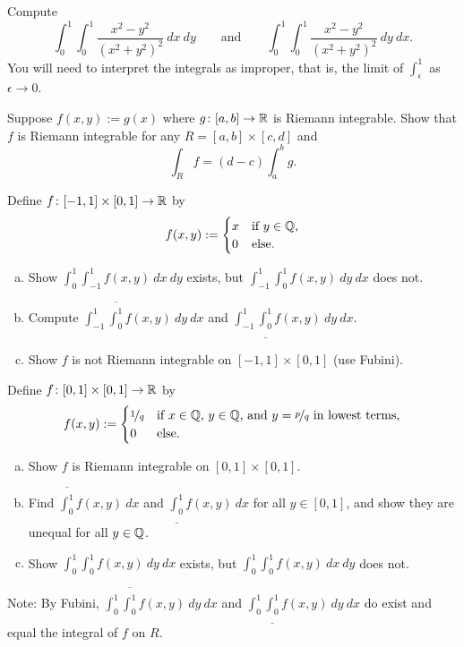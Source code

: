 \begin{exercise}
Compute
\begin{equation*}
\int_0^1 \int_0^1 \frac{x^2-y^2}{{(x^2+y^2)}^2} ~ dx ~ dy
\qquad \text{and} \qquad
\int_0^1 \int_0^1 \frac{x^2-y^2}{{(x^2+y^2)}^2} ~ dy ~ dx .
\end{equation*}
You will need to interpret the integrals as improper, that
is, the limit of $\int_\epsilon^1$ as $\epsilon \to 0$.
\end{exercise}

\begin{exercise}
Suppose $f(x,y) := g(x)$ where $g \colon [a,b] \to {\mathbb{R}}$ is Riemann integrable.
Show that $f$ is Riemann integrable for any $R = [a,b] \times [c,d]$ and 
\begin{equation*}
\int_R f = (d-c) \int_a^b g .
\end{equation*}
\end{exercise}

\begin{exercise}
Define $f \colon [-1,1] \times [0,1] \to {\mathbb{R}}$ by
\begin{equation*}
f(x,y) :=
\begin{cases}
x & \text{if $y \in {\mathbb{Q}}$,} \\
0 & \text{else.} 
\end{cases}
\end{equation*}
\begin{enumerate}[a)]
\item
Show
$\int_0^1 \int_{-1}^1 f(x,y) ~ dx ~ dy$ exists, but
$\int_{-1}^1 \int_0^1 f(x,y) ~ dy ~ dx$ does not.
\item
Compute
$\int_{-1}^1 \overline{\int_0^1} f(x,y) ~ dy ~ dx$ and
$\int_{-1}^1 \underline{\int_0^1} f(x,y) ~ dy ~ dx$.
\item
Show $f$ is not Riemann integrable on $[-1,1] \times [0,1]$ (use
Fubini).
\end{enumerate}
\end{exercise}

\begin{exercise}
Define $f \colon [0,1] \times [0,1] \to {\mathbb{R}}$ by
\begin{equation*}
f(x,y) :=
\begin{cases}
\nicefrac{1}{q} & \text{if $x \in {\mathbb{Q}}$, $y \in {\mathbb{Q}}$, and $y=\nicefrac{p}{q}$ in lowest terms,} \\
0 & \text{else.} 
\end{cases}
\end{equation*}
\begin{enumerate}[a)]
\item
Show $f$ is Riemann integrable on $[0,1] \times [0,1]$.
\item
Find 
$\overline{\int_0^1} f(x,y) ~ dx$ and
$\underline{\int_0^1} f(x,y) ~ dx$ for all $y \in [0,1]$, and show they are unequal for all $y
\in {\mathbb{Q}}$.
\item
Show
$\int_0^1 \int_0^1 f(x,y) ~ dy ~ dx$ exists, but
   $\int_0^1 \int_0^1 f(x,y) ~ dx ~ dy$ does not.
\end{enumerate}
Note: By Fubini,
$\int_0^1 \overline{\int_0^1} f(x,y) ~ dy ~ dx$ and 
$\int_0^1 \underline{\int_0^1} f(x,y) ~ dy ~ dx$ do exist and equal the
integral of $f$ on $R$.
\end{exercise}

